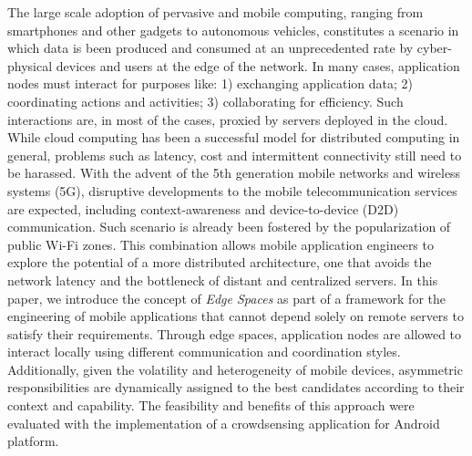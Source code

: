 The large scale adoption of pervasive and mobile computing, ranging from smartphones and other gadgets to autonomous vehicles, constitutes a scenario in which data is been produced and consumed at an unprecedented rate by cyber-physical devices and users at the edge of the network. In many cases, application nodes must interact for purposes like: 1) exchanging application data; 2) coordinating actions and activities; 3) collaborating for efficiency. Such interactions are, in most of the cases, proxied by servers deployed in the cloud. While cloud computing has been a successful model for distributed computing in general, problems such as latency, cost and intermittent connectivity still need to be harassed. With the advent of the 5th generation mobile networks and wireless systems (5G), disruptive developments to the mobile telecommunication services are expected, including context-awareness and device-to-device (D2D) communication. Such scenario is already been fostered by the popularization of public Wi-Fi zones. This combination allows mobile application engineers to explore the potential of a more distributed architecture, one that avoids the network latency and the bottleneck of distant and centralized servers. In this paper, we introduce the concept of \textit{Edge Spaces} as part of a framework for the engineering of mobile applications that cannot depend solely on remote servers to satisfy their requirements. Through edge spaces, application nodes are allowed to interact locally using different communication and coordination styles. Additionally, given the volatility and heterogeneity of mobile devices, asymmetric responsibilities are dynamically assigned to the best candidates according to their context and capability. The feasibility and benefits of this approach were evaluated with the implementation of a crowdsensing application for Android platform.



